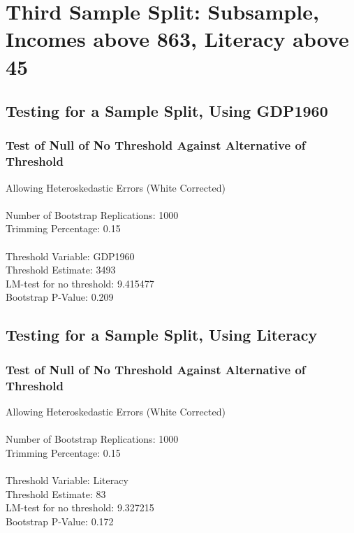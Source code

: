 \section{Third Sample Split: Subsample, Incomes above 863, Literacy above 45}

\subsection{Testing for a Sample Split, Using GDP1960} 
\subsubsection*{Test of Null of No Threshold Against Alternative of Threshold} 
Allowing Heteroskedastic Errors (White Corrected) \\\\
Number of Bootstrap Replications:  1000 \\
Trimming Percentage:               0.15 \\\\
Threshold Variable:                 GDP1960 \\
Threshold Estimate:                3493 \\
LM-test for no threshold:          9.415477 \\
Bootstrap P-Value:                 0.209 \\

\subsection{Testing for a Sample Split, Using Literacy} 
\subsubsection*{Test of Null of No Threshold Against Alternative of Threshold} 
Allowing Heteroskedastic Errors (White Corrected) \\\\
Number of Bootstrap Replications:  1000 \\
Trimming Percentage:               0.15 \\\\
Threshold Variable:                 Literacy \\
Threshold Estimate:                83 \\
LM-test for no threshold:          9.327215 \\
Bootstrap P-Value:                 0.172 \\

